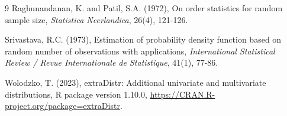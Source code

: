 \documentclass[twoside]{article}
\begin{document}
\begin{thebibliography}{9}
Raghunandanan, K. and Patil, S.A. (1972), On order statistics for random sample size, {\it Statistica Neerlandica}, { 26}(4), 121-126.

Srivastava, R.C.  (1973), Estimation of probability density function based on random number of observations with applications, {\it International Statistical Review / Revue Internationale de Statistique}, {41}(1), 77-86.

Wolodzko, T. (2023), extraDistr: Additional univariate and multivariate distributions, R package version 1.10.0, \url{https://CRAN.R-project.org/package=extraDistr}.
  
   \end{thebibliography}
 
\end{document}
